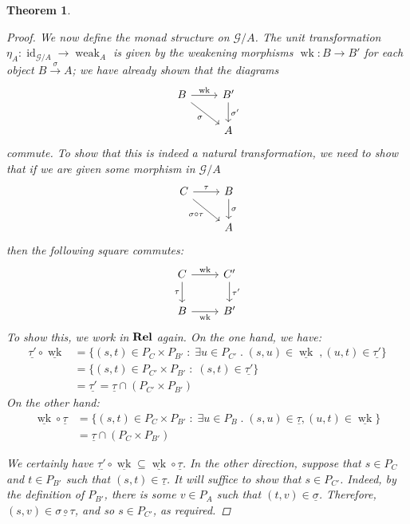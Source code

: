 \documentclass[11pt]{article} %
\theoremstyle{plain} %
\newtheorem{theorem}{Theorem}[section]
\theoremstyle{definition} %
\theoremstyle{note}
\theoremstyle{exercisestyle}
\newcommand{\catname}[1]{{\normalfont\textbf{#1}}}
\newcommand{\Rel}{\catname{Rel}}
\newcommand{\map}[3]{#2\xrightarrow{#1} #3}
\newcommand*\from{\colon}
\newcommand{\cmap}[3]{#1\from{}#2\to{}#3}
\DeclareMathOperator{\id}{id}
\newcommand{\comp}[2]{#1 \circ #2}
\newcommand{\G}{\mathcal G}
\newcommand{\suchthat}{\;\colon\;}
\newcommand{\esuchthat}{\;.\;}
\newcommand{\grel}[1]{\underline{#1}}
\DeclareMathOperator{\wk}{wk}
\DeclareMathOperator{\weak}{weak}
\begin{document}
\begin{theorem}
\begin{proof}
    We now define the monad structure on $\G/A$.  The unit transformation $\cmap{\eta_A}{\id_{\G/A}}{\weak_A}$ is given by the weakening morphisms $\cmap{\wk}{B}{B'}$ for each object $\map{\sigma}{B}{A}$; we have already shown that the diagrams
    \[
      \begin{tikzcd}
        B \arrow[r, "\wk"] \arrow[dr, "\sigma"']
         & B' \arrow[d, "\sigma'"] \\
         & A
      \end{tikzcd}
      \]
    commute.  To show that this is indeed a natural transformation, we need to show that if we are given some morphism in $\G/A$
    \[
      \begin{tikzcd}
        C \arrow[r, "\tau"] \arrow[dr, "\comp\sigma\tau"']
          & B \arrow[d, "\sigma"] \\
          & A
      \end{tikzcd}
      \]
    then the following square commutes:
    \[
      \begin{tikzcd}
        C \arrow[r, "\wk"] \arrow[d, "\tau"']
          & C' \arrow[d, "\tau'"] \\
        B \arrow[r, "\wk"']
          & B'
      \end{tikzcd}
      \]
    To show this, we work in $\Rel$ again.  On the one hand, we have:
    \begin{align*}
      \comp{\grel{\tau'}}{\grel{\wk}} & = \{(s,t)\in P_C\times P_{B'}\suchthat\exists u\in P_{C'}\esuchthat (s,u)\in\grel\wk\;,(u,t)\in\grel{\tau'}\} \\
       & = \{(s, t)\in P_{C'}\times P_{B'}\suchthat (s,t)\in\grel{\tau'}\} \\
       & = \grel{\tau'} = \grel{\tau}\cap(P_{C'}\times P_{B'})
    \end{align*}
    On the other hand:
    \begin{align*}
      \comp{\grel\wk}{\grel\tau} & = \{(s, t)\in P_C\times P_{B'}\suchthat \exists u\in P_B\esuchthat (s,u)\in \grel\tau, (u, t)\in \grel\wk\} \\
       & = \grel\tau \cap (P_C\times P_{B'})
    \end{align*}
    
    We certainly have $\comp{\grel{\tau'}}{\grel\wk}\subseteq\comp{\grel\wk}{\grel\tau}$.  In the other direction, suppose that $s\in P_C$ and $t\in P_{B'}$ such that $(s,t)\in\grel\tau$.  It will suffice to show that $s\in P_{C'}$.  Indeed, by the definition of $P_{B'}$, there is some $v\in P_A$ such that $(t, v)\in\grel\sigma$.  Therefore, $(s, v)\in\grel{\comp{\sigma}{\tau}}$, and so $s\in P_{C'}$, as required.  


\end{proof}
\end{theorem}
\end{document}
